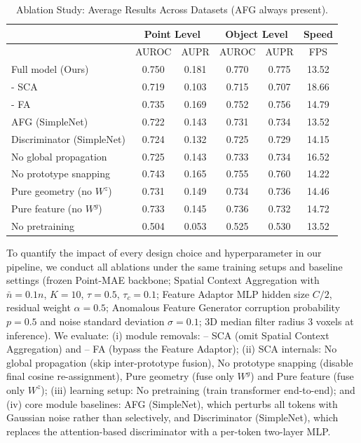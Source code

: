 \begin{table}[ht]
\centering
\caption{Ablation Study: Average Results Across Datasets (AFG always present).}
\label{tab:Ablation}
\begin{tabular}{l|cc|cc|c}
\hline
& \multicolumn{2}{c|}{Point Level} & \multicolumn{2}{c|}{Object Level} & Speed \\
\hline
& AUROC & AUPR & AUROC & AUPR & FPS \\
\hline
Full model (Ours)          & 0.750 & 0.181 & 0.770 & 0.775 & 13.52 \\
- SCA                      & 0.719 & 0.103 & 0.715 & 0.707 & 18.66 \\
- FA                       & 0.735 & 0.169 & 0.752 & 0.756 & 14.79 \\
AFG (SimpleNet)            & 0.722 & 0.143 & 0.731 & 0.734 & 13.52 \\
Discriminator (SimpleNet)  & 0.724 & 0.132 & 0.725 & 0.729 & 14.15 \\
No global propagation      & 0.725 & 0.143 & 0.733 & 0.734 & 16.52 \\
No prototype snapping      & 0.743 & 0.165 & 0.755 & 0.760 & 14.22 \\
Pure geometry (no $W^z$)   & 0.731 & 0.149 & 0.734 & 0.736 & 14.46 \\
Pure feature (no $W^g$)    & 0.733 & 0.145 & 0.736 & 0.732 & 14.72 \\
No pretraining             & 0.504 & 0.053 & 0.525 & 0.530 & 13.52 \\
\hline
\end{tabular}
\end{table}

To quantify the impact of every design choice and hyperparameter in our pipeline, we conduct all ablations under the same training setups and baseline settings (frozen Point-MAE backbone; Spatial Context Aggregation with $\bar{n}=0.1n$, $K=10$, $\tau=0.5$, $\tau_c=0.1$; Feature Adaptor MLP hidden size $C/2$, residual weight $\alpha=0.5$; Anomalous Feature Generator corruption probability $p=0.5$ and noise standard deviation $\sigma=0.1$; 3D median filter radius 3 voxels at inference). We evaluate: (i) module removals: -- SCA (omit Spatial Context Aggregation) and -- FA (bypass the Feature Adaptor); (ii) SCA internals: No global propagation (skip inter-prototype fusion), No prototype snapping (disable final cosine re-assignment), Pure geometry (fuse only $W^g$) and Pure feature (fuse only $W^z$); (iii) learning setup: No pretraining (train transformer end-to-end); and (iv) core module baselines: AFG (SimpleNet), which perturbs all tokens with Gaussian noise rather than selectively, and Discriminator (SimpleNet), which replaces the attention-based discriminator with a per-token two-layer MLP.

